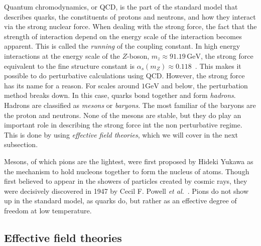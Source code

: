 Quantum chromodynamics, or QCD, is the part of the standard model that describes quarks, the constituents of protons and neutrons, and how they interact via the strong nuclear force.
When dealing with the strong force, the fact that the strength of interaction depend on the energy scale of the interaction becomes apparent.
This is called the \emph{running} of the coupling constant.
In high energy interactions at the energy scale of the $Z$-boson, $m_z \approx 91.19 \, \text{GeV}$, the strong force equivalent to the fine structure constant is $\alpha_s(m_Z) \approx 0.118$~\cite{PDG}. 
This makes it possible to do perturbative calculations using QCD.
However, the strong force has its name for a reason.
For scales around $1 \text{GeV}$ and below, the perturbation method breaks down.
In this case, quarks bond together and form \emph{hadrons}.
Hadrons are classified as \emph{mesons} or \emph{baryons}.
The most familiar of the baryons are the proton and neutrons.
None of the mesons are stable, but they do play an important role in describing the strong force int the non perturbative regime.
This is done by using \emph{effective field theories}, which we will cover in the next subsection.

Mesons, of which pions are the lightest, were first proposed by Hideki Yukawa as the mechanism to hold nucleons together to form the nucleus of atoms.
Though first believed to appear in the showers of particles created by cosmic rays, they were decisively discovered in 1947 by Cecil F. Powell \emph{et al.}~\cite{griffiths:introduction}.
Pions do not show up in the standard model, as quarks do, but rather as an effective degree of freedom at low temperature.


\subsection*{Effective field theories}

